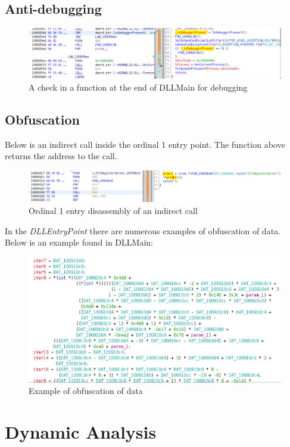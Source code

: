 \documentclass{article}
\begin{document}
    \subsection{Anti-debugging}
    \begin{figure}[H]
        \includegraphics[width=\textwidth]{antidebuging.png}
        \caption{A check in a function at the end of DLLMain for debugging}
    \end{figure}
    \subsection{Obfuscation}
    Below is an indirect call inside the ordinal 1 entry point. The function above returns the address to the call.
    \begin{figure}[H]
        \includegraphics[width=\textwidth]{ord1obf.png}
        \caption{Ordinal 1 entry disassembly of an indirect call}
    \end{figure}
    In the \textit{DLLEntryPoint} there are numerous examples of obfuscation of data. Below is an example found in DLLMain:
    \begin{figure}[H]
        \includegraphics[width=\textwidth]{obfex.png}
        \caption{Example of obfuscation of data}
    \end{figure}
    \pagebreak
    \section{Dynamic Analysis}
\end{document}
